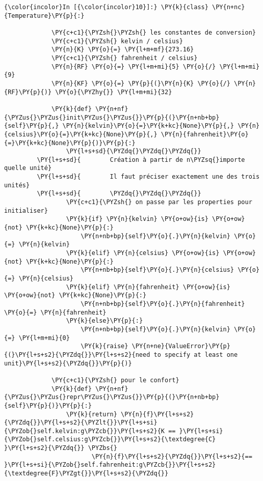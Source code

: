     \begin{Verbatim}[commandchars=\\\{\}]
{\color{incolor}In [{\color{incolor}10}]:} \PY{k}{class} \PY{n+nc}{Temperature}\PY{p}{:}
         
             \PY{c+c1}{\PYZsh{}\PYZsh{} les constantes de conversion}
             \PY{c+c1}{\PYZsh{} kelvin / celsius}
             \PY{n}{K} \PY{o}{=} \PY{l+m+mf}{273.16}
             \PY{c+c1}{\PYZsh{} fahrenheit / celsius}
             \PY{n}{RF} \PY{o}{=} \PY{l+m+mi}{5} \PY{o}{/} \PY{l+m+mi}{9}
             \PY{n}{KF} \PY{o}{=} \PY{p}{(}\PY{n}{K} \PY{o}{/} \PY{n}{RF}\PY{p}{)} \PY{o}{\PYZhy{}} \PY{l+m+mi}{32}
         
             \PY{k}{def} \PY{n+nf}{\PYZus{}\PYZus{}init\PYZus{}\PYZus{}}\PY{p}{(}\PY{n+nb+bp}{self}\PY{p}{,} \PY{n}{kelvin}\PY{o}{=}\PY{k+kc}{None}\PY{p}{,} \PY{n}{celsius}\PY{o}{=}\PY{k+kc}{None}\PY{p}{,} \PY{n}{fahrenheit}\PY{o}{=}\PY{k+kc}{None}\PY{p}{)}\PY{p}{:}
                 \PY{l+s+sd}{\PYZdq{}\PYZdq{}\PYZdq{}}
         \PY{l+s+sd}{        Création à partir de n\PYZsq{}importe quelle unité}
         \PY{l+s+sd}{        Il faut préciser exactement une des trois unités}
         \PY{l+s+sd}{        \PYZdq{}\PYZdq{}\PYZdq{}}
                 \PY{c+c1}{\PYZsh{} on passe par les properties pour initialiser}
                 \PY{k}{if} \PY{n}{kelvin} \PY{o+ow}{is} \PY{o+ow}{not} \PY{k+kc}{None}\PY{p}{:}
                     \PY{n+nb+bp}{self}\PY{o}{.}\PY{n}{kelvin} \PY{o}{=} \PY{n}{kelvin}
                 \PY{k}{elif} \PY{n}{celsius} \PY{o+ow}{is} \PY{o+ow}{not} \PY{k+kc}{None}\PY{p}{:}
                     \PY{n+nb+bp}{self}\PY{o}{.}\PY{n}{celsius} \PY{o}{=} \PY{n}{celsius}
                 \PY{k}{elif} \PY{n}{fahrenheit} \PY{o+ow}{is} \PY{o+ow}{not} \PY{k+kc}{None}\PY{p}{:}
                     \PY{n+nb+bp}{self}\PY{o}{.}\PY{n}{fahrenheit} \PY{o}{=} \PY{n}{fahrenheit}
                 \PY{k}{else}\PY{p}{:}
                     \PY{n+nb+bp}{self}\PY{o}{.}\PY{n}{kelvin} \PY{o}{=} \PY{l+m+mi}{0}
                     \PY{k}{raise} \PY{n+ne}{ValueError}\PY{p}{(}\PY{l+s+s2}{\PYZdq{}}\PY{l+s+s2}{need to specify at least one unit}\PY{l+s+s2}{\PYZdq{}}\PY{p}{)}
         
             \PY{c+c1}{\PYZsh{} pour le confort}
             \PY{k}{def} \PY{n+nf}{\PYZus{}\PYZus{}repr\PYZus{}\PYZus{}}\PY{p}{(}\PY{n+nb+bp}{self}\PY{p}{)}\PY{p}{:}
                 \PY{k}{return} \PY{n}{f}\PY{l+s+s2}{\PYZdq{}}\PY{l+s+s2}{\PYZlt{}}\PY{l+s+si}{\PYZob{}self.kelvin:g\PYZcb{}}\PY{l+s+s2}{K == }\PY{l+s+si}{\PYZob{}self.celsius:g\PYZcb{}}\PY{l+s+s2}{\textdegree{C} }\PY{l+s+s2}{\PYZdq{}} \PYZbs{}
                        \PY{n}{f}\PY{l+s+s2}{\PYZdq{}}\PY{l+s+s2}{== }\PY{l+s+si}{\PYZob{}self.fahrenheit:g\PYZcb{}}\PY{l+s+s2}{\textdegree{F}\PYZgt{}}\PY{l+s+s2}{\PYZdq{}}
         

\end{Verbatim}
